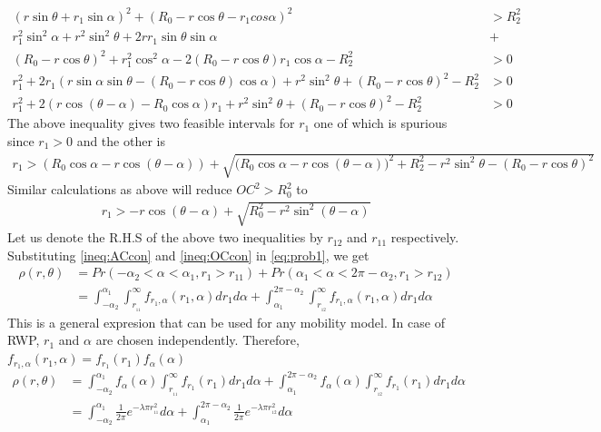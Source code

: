 \begin{align*}
	(r\sin\theta + r_1\sin\alpha)^2 + (R_0-r\cos\theta-r_1cos\alpha)^2 &> R_2^2 \\
	r_1^2 \sin^2\alpha + r^2\sin^2\theta + 2rr_1\sin\theta\sin\alpha &+ \\ (R_0-r\cos\theta)^2 +
	r_1^2\cos^2\alpha - 2(R_0-r\cos\theta)r_1\cos\alpha - R_2^2 &> 0\\ 
	r_1^2 + 2 r_1 (r\sin\alpha\sin\theta-(R_0-r\cos\theta)\cos\alpha) + r^2\sin^2\theta +
	(R_0-r\cos\theta)^2 -R_2^2 &>0 \\
	r_1^2 + 2(r\cos(\theta-\alpha) - R_0\cos\alpha) r_1 + r^2\sin^2\theta +	(R_0-r\cos\theta)^2 - R_2^2 &> 0 
\end{align*}
The above inequality gives two feasible intervals for $r_1$ one of which is spurious since $r_1 > 0$ and the other is 
\begin{align}\label{ineq:ACcon}
	r_1 > (R_0\cos\alpha - r\cos(\theta-\alpha)) + \sqrt{\big(R_0\cos\alpha-r\cos(\theta-\alpha)\big)^2 + R_2^2 - r^2\sin^2\theta - 	(R_0-r\cos\theta)^2 }
\end{align}
Similar calculations as above will reduce $OC^2 > R_0^2$ to
\begin{align} \label{ineq:OCcon}
	r_1 > -r\cos(\theta-\alpha) + \sqrt{R_0^2 - r^2\sin^2(\theta-\alpha)}
\end{align}
Let us denote the R.H.S of the above two inequalities by $r_{12}$ and $r_{11}$ respectively.
Substituting \ref{ineq:ACcon} and \ref{ineq:OCcon} in \ref{eq:prob1}, we get
\begin{align*}
	\rho(r,\theta) &= Pr(-\alpha_2 < \alpha < \alpha_1,r_1 > r_{11}) + Pr(\alpha_1 < \alpha < 2\pi-\alpha_2, r_1 > r_{12}) \\
	&= \int_{-\alpha_2}^{\alpha_1} \int_{r_{\!_{11}}}^{\infty} f_{r_1,\alpha}(r_1,\alpha)dr_1 d\alpha +  \int^{2\pi-\alpha_2}_{\alpha_1} \int_{r_{\!_{12}}}^{\infty} f_{r_1,\alpha}(r_1,\alpha)dr_1 d\alpha 
\end{align*}
	This is a general expresion that can be used for any mobility model. In case of RWP,
	$r_1$ and $\alpha$ are chosen independently. Therefore, 
	$f_{r_1,\alpha}(r_1,\alpha) = f_{r_1}(r_1)f_{\alpha}(\alpha)$ 
\begin{align*}
	\rho(r,\theta)&= \int_{-\alpha_2}^{\alpha_1} f_{\alpha}(\alpha) \int_{r_{\!_{11}}}^{\infty} f_{r_1}(r_1)dr_1 d\alpha +  \int^{2\pi-\alpha_2}_{\alpha_1} f_{\alpha}(\alpha) \int_{r_{\!_{12}}}^{\infty} f_{r_1}(r_1)dr_1 d\alpha  \\
	&= \int_{-\alpha_2}^{\alpha_1} \frac{1}{2\pi} e^{-\lambda \pi r_{\!_{11}}^2} d\alpha +  \int^{2\pi-\alpha_2}_{\alpha_1} \frac{1}{2\pi} e^{-\lambda \pi r_{\!_{12}}^2} d\alpha
\end{align*}
